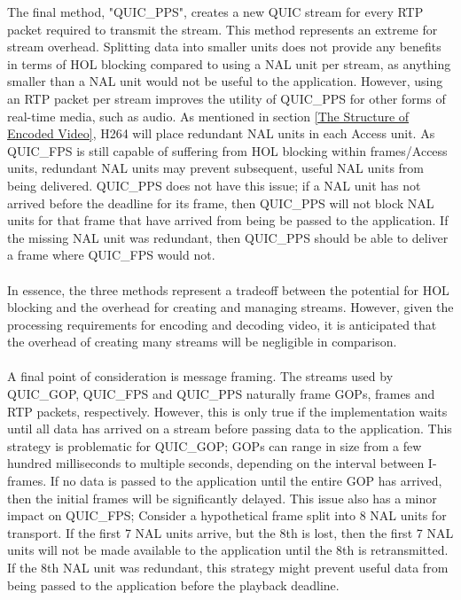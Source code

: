 \documentclass{mpaper}
\begin{document}
The final method, "QUIC\_PPS", creates a new QUIC stream for every RTP packet required to transmit the stream. This method represents an extreme for stream overhead. Splitting data into smaller units does not provide any benefits in terms of HOL blocking compared to using a NAL unit per stream, as anything smaller than a NAL unit would not be useful to the application. However, using an RTP packet per stream improves the utility of QUIC\_PPS for other forms of real-time media, such as audio. As mentioned in section \ref{The Structure of Encoded Video}, H264 will place redundant NAL units in each Access unit. As QUIC\_FPS is still capable of suffering from HOL blocking within frames/Access units, redundant NAL units may prevent subsequent, useful NAL units from being delivered. QUIC\_PPS does not have this issue; if a NAL unit has not arrived before the deadline for its frame, then QUIC\_PPS will not block NAL units for that frame that have arrived from being be passed to the application. If the missing NAL unit was redundant, then QUIC\_PPS should be able to deliver a frame where QUIC\_FPS would not.
\\\\
In essence, the three methods represent a tradeoff between the potential for HOL blocking and the overhead for creating and managing streams. However, given the processing requirements for encoding and decoding video, it is anticipated that the overhead of creating many streams will be negligible in comparison.
\\\\
A final point of consideration is message framing. The streams used by QUIC\_GOP, QUIC\_FPS and QUIC\_PPS naturally frame GOPs, frames and RTP packets, respectively. However, this is only true if the implementation waits until all data has arrived on a stream before passing data to the application. This strategy is problematic for QUIC\_GOP; GOPs can range in size from a few hundred milliseconds to multiple seconds, depending on the interval between I-frames. If no data is passed to the application until the entire GOP has arrived, then the initial frames will be significantly delayed. This issue also has a minor impact on QUIC\_FPS; Consider a hypothetical frame split into 8 NAL units for transport. If the first 7 NAL units arrive, but the 8th is lost, then the first 7 NAL units will not be made available to the application until the 8th is retransmitted. If the 8th NAL unit was redundant, this strategy might prevent useful data from being passed to the application before the playback deadline.
\end{document}
